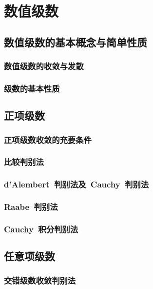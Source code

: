 

\chapter{数值级数}\label{ch:11}
\section{数值级数的基本概念与简单性质}
\subsection{数值级数的收敛与发散}
\subsection{级数的基本性质}
\begin{exercise}
\item
\end{exercise}
\section{正项级数}
\subsection{正项级数收敛的充要条件}
\subsection{比较判别法}
\subsection{d'Alembert~判别法及~Cauchy~判别法}
\subsection{Raabe~判别法}
\subsection{Cauchy~积分判别法}
\begin{exercise}
\item
\end{exercise}
\section{任意项级数}
\subsection{交错级数收敛判别法}
